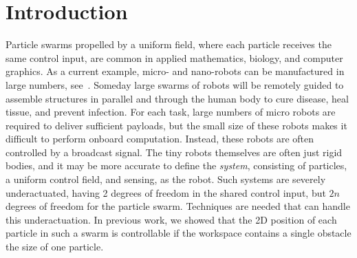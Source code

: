 \section{Introduction}\label{sec:Intro}
Particle swarms propelled by a uniform field, where each particle  receives the same control input, are common in applied mathematics, biology, and computer graphics. 
As a current example, micro- and nano-robots can be manufactured in large numbers, see~\cite{Chowdhury2015,martel2014computer,kim2015imparting,Donald2013,Ghosh2009,Ou2013,qiu2015magnetic}.
Someday large swarms of robots will be remotely guided
to assemble structures in parallel and 
 through the human body to cure disease, heal tissue, and prevent infection. %
 For each task, large numbers of micro robots are required to deliver sufficient payloads, but the small size of these robots makes it difficult to perform onboard computation.  Instead, these robots are often controlled by a broadcast signal. 
 The tiny robots themselves are often just rigid bodies, and it may be more accurate to define the \emph{system}, consisting of particles, a uniform control field, and sensing, as the robot.
Such systems are severely underactuated, having 2 degrees of freedom in the shared control input, but $2n$ degrees of freedom for the particle swarm.
 Techniques are needed that can handle this underactuation. 
 In previous work, we showed that the 2D position of each particle in such a swarm is controllable if the workspace contains a single obstacle the size of one particle.


